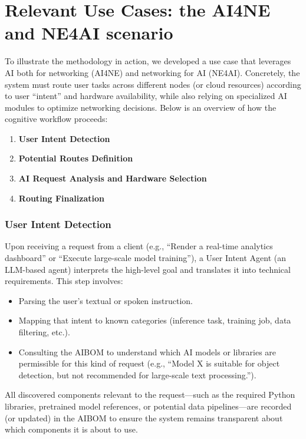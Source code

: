 \chapter{Relevant Use Cases: the AI4NE and NE4AI scenario}\label{ch:chapter3}

To illustrate the methodology in action, we developed a use case that leverages AI both for networking (AI4NE) and networking for AI (NE4AI). Concretely, the system must route user tasks across different nodes (or cloud resources) according to user ``intent'' and hardware availability, while also relying on specialized AI modules to optimize networking decisions. Below is an overview of how the cognitive workflow proceeds:
\begin{enumerate}[leftmargin=*, label=\textbf{\arabic*.}]
    \item \textbf{User Intent Detection}
    \item \textbf{Potential Routes Definition}
    \item \textbf{AI Request Analysis and Hardware Selection}
    \item \textbf{Routing Finalization}
\end{enumerate}

\subsection{User Intent Detection}

Upon receiving a request from a client (e.g., ``Render a real-time analytics dashboard'' or ``Execute large-scale model training''), a User Intent Agent (an LLM-based agent) interprets the high-level goal and translates it into technical requirements. This step involves:
\begin{itemize}[leftmargin=*, label=--]
    \item Parsing the user’s textual or spoken instruction.
    \item Mapping that intent to known categories (inference task, training job, data filtering, etc.).
    \item Consulting the AIBOM to understand which AI models or libraries are permissible for this kind of request (e.g., ``Model X is suitable for object detection, but not recommended for large-scale text processing.'').
\end{itemize}

All discovered components relevant to the request---such as the required Python libraries, pretrained model references, or potential data pipelines---are recorded (or updated) in the AIBOM to ensure the system remains transparent about which components it is about to use.

